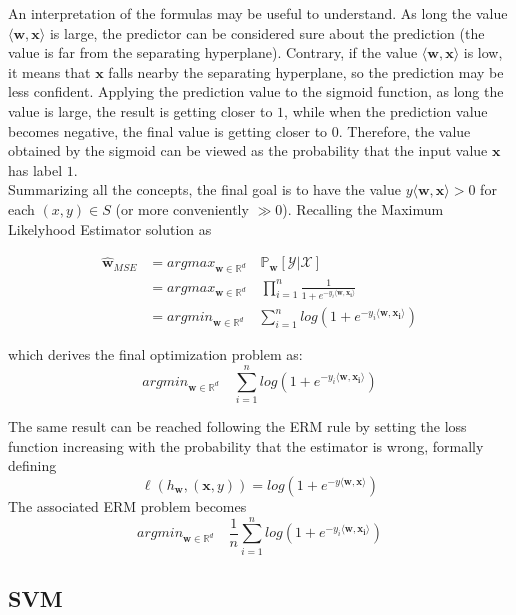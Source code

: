 An interpretation of the formulas may be useful to understand. As long the value $\langle \mathbf{w}, \mathbf{x} \rangle$ is large, the predictor can be considered sure about the prediction (the value is far from the separating hyperplane). Contrary, if the value $\langle \mathbf{w}, \mathbf{x} \rangle$ is low, it means that $\mathbf{x}$ falls nearby the separating hyperplane, so the prediction may be less confident. Applying the prediction value to the sigmoid function, as long the value is large, the result is getting closer to $1$, while when the prediction value becomes negative, the final value is getting closer to $0$.
Therefore, the value obtained by the sigmoid can be viewed as the probability that the input value $\mathbf{x}$ has label $1$.\\
Summarizing all the concepts, the final goal is to have the value $y \langle \mathbf{w}, \mathbf{x} \rangle > 0$ for each $(x, y) \in S$ (or more conveniently $\gg 0$). Recalling the Maximum Likelyhood Estimator solution as

\begin{align*}
 \hat{\mathbf{w}}_{MSE} &= argmax_{\mathbf{w} \in \mathbb{R}^d} \quad \mathbb{P}_\mathbf{w}[\mathcal{Y} | \mathcal{X}]	\\
 						&= argmax_{\mathbf{w} \in \mathbb{R}^d} \quad \prod_{i=1}^{n} \frac{1}{1 + e^{-y_i \langle \mathbf{w}, \mathbf{x_i} \rangle}}	\\
 						&= argmin_{\mathbf{w} \in \mathbb{R}^d} \quad \sum_{i=1}^{n} log(1 + e^{-y_i \langle \mathbf{w}, \mathbf{x_i} \rangle})
\end{align*}

which derives the final optimization problem as:
\[ argmin_{\mathbf{w} \in \mathbb{R}^d} \quad \sum_{i=1}^{n} log(1 + e^{-y_i \langle \mathbf{w}, \mathbf{x_i} \rangle}) \]

The same result can be reached following the \ac{ERM} rule by setting the loss function increasing with the probability that the estimator is wrong, formally defining
\[ \ell (h_\mathbf{w}, (\mathbf{x}, y)) = log(1 + e^{-y \langle \mathbf{w}, \mathbf{x} \rangle}) \]
The associated ERM problem becomes
\[ argmin_{\mathbf{w} \in \mathbb{R}^d} \quad \frac{1}{n} \sum_{i=1}^{n} log(1 + e^{-y_i \langle \mathbf{w}, \mathbf{x_i} \rangle}) \]



\subsection{SVM}

